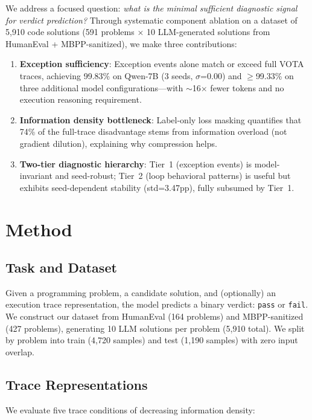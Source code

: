 \documentclass[11pt]{article}
\begin{document}
We address a focused question: \emph{what is the minimal sufficient diagnostic signal for verdict prediction?} Through systematic component ablation on a dataset of 5,910 code solutions (591 problems $\times$ 10 LLM-generated solutions from HumanEval + MBPP-sanitized), we make three contributions:

\begin{enumerate}
\item \textbf{Exception sufficiency}: Exception events alone match or exceed full VOTA traces, achieving 99.83\% on Qwen-7B (3 seeds, $\sigma$=0.00) and $\geq$99.33\% on three additional model configurations---with $\sim$16$\times$ fewer tokens and no execution reasoning requirement.
\item \textbf{Information density bottleneck}: Label-only loss masking quantifies that 74\% of the full-trace disadvantage stems from information overload (not gradient dilution), explaining why compression helps.
\item \textbf{Two-tier diagnostic hierarchy}: Tier~1 (exception events) is model-invariant and seed-robust; Tier~2 (loop behavioral patterns) is useful but exhibits seed-dependent stability (std=3.47pp), fully subsumed by Tier~1.
\end{enumerate}

\section{Method}

\subsection{Task and Dataset}

Given a programming problem, a candidate solution, and (optionally) an execution trace representation, the model predicts a binary verdict: \texttt{pass} or \texttt{fail}. We construct our dataset from HumanEval (164 problems) and MBPP-sanitized (427 problems), generating 10 LLM solutions per problem (5,910 total). We split by problem into train (4,720 samples) and test (1,190 samples) with zero input overlap.

\subsection{Trace Representations}

We evaluate five trace conditions of decreasing information density:
\end{document}
